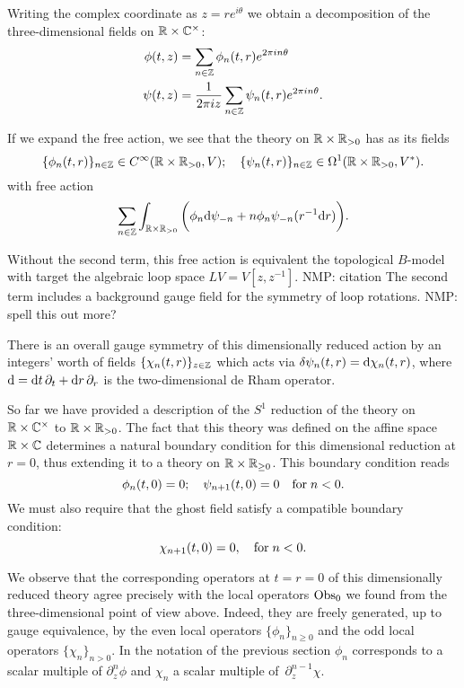 \documentclass[11pt]{amsart}
\def\natalie#1{{\textcolor{green!65!black}{NMP: {#1}}}}
\begin{document}
Writing the complex coordinate as $z = r e^{i \theta}$ we obtain a decomposition of the three-dimensional fields on $\mathbb R \times \mathbb C^\times$:
\begin{align*}
\phi(t,z) & = \sum_{n \in \mathbb Z} \phi_n (t,r) e^{2 \pi i n \theta} \\
\psi(t,z) & = \frac{1}{2 \pi i z} \sum_{n \in \mathbb Z} \psi_n(t, r) e^{2 \pi i n \theta} .
\end{align*}

If we expand the free action, we see that the theory on $\mathbb R \times \mathbb R_{>0}$ has as its fields 
\[
\{\phi_n(t,r)\}_{n \in \mathbb Z} \in C^\infty(\mathbb R \times \mathbb R_{>0} , V) ; \quad \{\psi_n (t,r)\}_{n \in \mathbb Z} \in \Omega^1 (\mathbb R \times \mathbb R_{>0}, V^*) .
\] 
with free action
\[
\sum_{n \in \mathbb Z} \int_{\mathbb R \times \mathbb R_{>0}} \bigg(\phi_n {\rm d} \psi_{-n} + n \phi_n \psi_{-n} (r^{-1} {\rm d} r)  \bigg).
\]

Without the second term, this free action is equivalent the topological $B$-model with target the algebraic loop space $L V = V[z,z^{-1}]$.  \natalie{citation}
The second term includes a background gauge field for the symmetry of loop rotations. \natalie{spell this out more?}

There is an overall gauge symmetry of this dimensionally reduced action by an integers' worth of fields $\{\chi_n (t,r)\}_{z \in \mathbb Z}$ which acts via $\delta \psi_n (t,r) = {\rm d} \chi_n (t,r)$, where ${\rm d} = {\rm d} t \,\partial_t + {\rm d} r \,\partial_r$ is the two-dimensional de Rham operator. 

So far we have provided a description of the $S^1$ reduction of the theory on $\mathbb R \times \mathbb C^\times$ to $\mathbb R \times \mathbb R_{>0}$. 
The fact that this theory was defined on the affine space $\mathbb R \times \mathbb C$ determines a natural boundary condition for this dimensional reduction at $r = 0$, thus extending it to a theory on $\mathbb R \times \mathbb R_{\geq 0}$. 
This boundary condition reads
\begin{equation}\label{eqn:bc1}
\phi_n (t, 0) = 0 ; \quad \psi_{n+1} (t,0) = 0 \quad {\rm for} \; n < 0 .
\end{equation}
We must also require that the ghost field satisfy a compatible boundary condition:
\begin{equation}\label{eqn:gbc1}
\chi_{n+1} (t,0) = 0, \quad {\rm for} \; n < 0 .
\end{equation}

We observe that the corresponding operators at $t = r = 0$ of this dimensionally reduced theory agree precisely with the local operators ${\rm Obs}_0$ we found from the three-dimensional point of view above. 
Indeed, they are freely generated, up to gauge equivalence, by the even local operators $\{\phi_n\}_{n \geq 0}$ and the odd local operators $\{\chi_n\}_{n > 0}$. 
In the notation of the previous section $\phi_n$ corresponds to a scalar multiple of $\partial_z^n \phi$ and $\chi_n$ a scalar multiple of~$\partial^{n-1}_z \chi$. 
\end{document}
